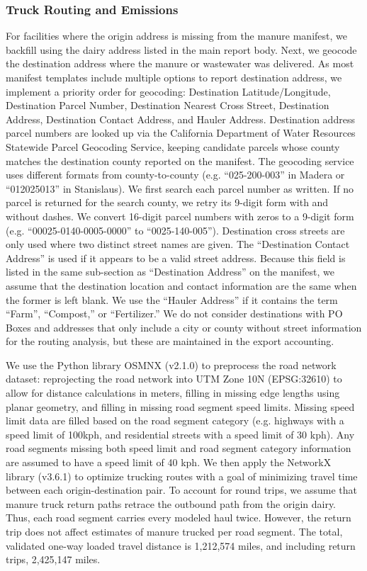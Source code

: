 \documentclass{iopjournal}
\begin{document}
\subsubsection{Truck Routing and Emissions}
For facilities where the origin address is missing from the manure manifest, we backfill using the dairy address listed in the main report body. Next, we geocode the destination address where the manure or wastewater was delivered. As most manifest templates include multiple options to report destination address, we implement a priority order for geocoding: Destination Latitude/Longitude, Destination Parcel Number, Destination Nearest Cross Street, Destination Address, Destination Contact Address, and Hauler Address. Destination address parcel numbers are looked up via the California Department of Water Resources Statewide Parcel Geocoding Service\cite{dwr_parcel_geocoding}, keeping candidate parcels whose county matches the destination county reported on the manifest. The geocoding service uses different formats from county-to-county (e.g. ``025-200-003'' in Madera or ``012025013'' in Stanislaus). We first search each parcel number as written. If no parcel is returned for the search county, we retry its 9-digit form with and without dashes. We convert 16-digit parcel numbers with zeros to a 9-digit form (e.g. ``00025-0140-0005-0000'' to ``0025-140-005''). Destination cross streets are only used where two distinct street names are given. The “Destination Contact Address” is used if it appears to be a valid street address. Because this field is listed in the same sub-section as “Destination Address” on the manifest, we assume that the destination location and contact information are the same when the former is left blank. We use the “Hauler Address” if it contains the term “Farm”, “Compost,” or “Fertilizer.” We do not consider destinations with PO Boxes and addresses that only include a city or county without street information for the routing analysis, but these are maintained in the export accounting.

We use the Python library OSMNX (v2.1.0) \cite{OSMNX_2025} to preprocess the road network dataset: reprojecting the road network into UTM Zone 10N (EPSG:32610) to allow for distance calculations in meters, filling in missing edge lengths using planar geometry, and filling in missing road segment speed limits. Missing speed limit data are filled based on the road segment category (e.g. highways with a speed limit of 100kph, and residential streets with a speed limit of 30 kph). Any road segments missing both speed limit and road segment category information are assumed to have a speed limit of 40 kph. We then apply the NetworkX library (v3.6.1) \cite{NetworkX_2008} to optimize trucking routes with a goal of minimizing travel time between each origin-destination pair. To account for round trips, we assume that manure truck return paths retrace the outbound path from the origin dairy. Thus, each road segment carries every modeled haul twice. However, the return trip does not affect estimates of manure trucked per road segment. The total, validated one-way loaded travel distance is 1,212,574 miles, and including return trips, 2,425,147 miles.
\end{document}

